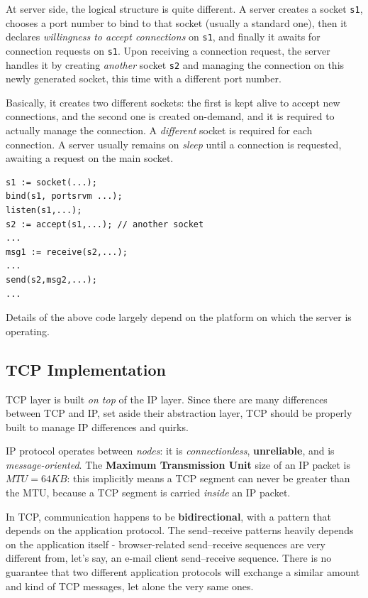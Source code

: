 \documentclass[10pt]{extreport}
\begin{document}
At server side, the logical structure is quite different. A server creates
a socket \texttt{s1}, chooses a port number to bind to that socket (usually a
standard one), then it declares \emph{willingness to accept connections} on
\texttt{s1}, and finally it awaits for connection requests on \texttt{s1}. Upon
receiving a connection request, the server handles it by creating
\emph{another} socket \texttt{s2} and managing the connection on this newly
generated socket, this time with a different port number. 

Basically, it creates two different sockets: the first is kept alive to accept
new connections, and the second one is created on-demand, and it is required to
actually manage the connection. A \emph{different} socket is required for each
connection. A server usually remains on \emph{sleep} until a connection is
requested, awaiting a request on the main socket.

\begin{verbatim} 
s1 := socket(...);
bind(s1, portsrvm ...);
listen(s1,...);
s2 := accept(s1,...); // another socket
... 
msg1 := receive(s2,...);
...
send(s2,msg2,...);
... 
\end{verbatim}

Details of the above code largely depend on the platform on which the server is
operating.

\subsection{TCP Implementation}

TCP layer is built \emph{on top} of the IP layer. Since there are many differences
between TCP and IP, set aside their abstraction layer, TCP should be properly
built to manage IP differences and quirks. 

IP protocol operates between \emph{nodes}: it is \emph{connectionless},
\textbf{unreliable}, and is \emph{message-oriented}. The \textbf{Maximum
Transmission Unit} size of an IP packet is $MTU = 64KB$: this implicitly means
a TCP segment can never be greater than the MTU, because a TCP segment is
carried \emph{inside} an IP packet.

In TCP, communication happens to be \textbf{bidirectional}, with a pattern that
depends on the application protocol. The send\---receive patterns heavily depends
on the application itself \-- browser-related send\---receive sequences are
very different from, let's say, an e-mail client send\---receive sequence.
There is no guarantee that two different application protocols will exchange a
similar amount and kind of TCP messages, let alone the very same ones.
\end{document}
